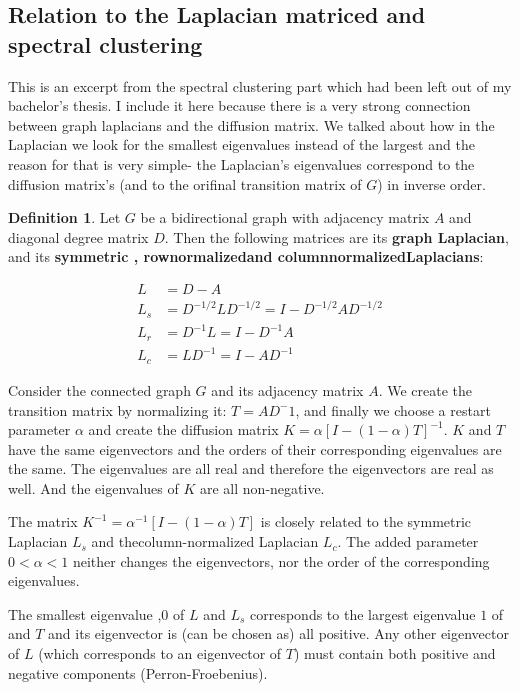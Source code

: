 \documentclass[10pt]{article}
\newcommand{\lt}{<}
\theoremstyle{definition}
\newtheorem{mydef}{Definition}[section]
\theoremstyle{remark}
\theoremstyle{plain}
\begin{document}
\subsection{Relation to the Laplacian matriced and spectral
clustering}

This is an excerpt from the spectral clustering part which had been
left out of my bachelor's thesis. I include it here because
there is a very strong connection between graph laplacians and
the diffusion matrix. We talked about how in the Laplacian
we look for the smallest eigenvalues instead of the largest and the
reason for that is very simple- the Laplacian's eigenvalues
correspond to the diffusion matrix's (and to the orifinal transition
matrix of $G$) in inverse order.

\begin{mydef}
\label{def:Laplacian}
Let $G$ be a bidirectional graph with adjacency matrix $A$ and diagonal degree
matrix $D$.
Then the following matrices are its \textbf{graph Laplacian}, and its
\textbf{symmetric\textemdash
, row\textendash normalized\textemdash and column\textendash normalized\textemdash Laplacians}:  

\begin{equation}
\begin{aligned}
L & = D - A \\
L_s & = D^{-1/2}LD^{-1/2} = I - D^{-1/2}AD^{-1/2} \\
L_r & = D^{-1}L = I - D^{-1}A \\
L_c & = LD^{-1} = I - AD^{-1}
\end{aligned}
\end{equation}
\end{mydef}

Consider the connected graph $G$ and its adjacency matrix $A$. We create the transition
matrix by normalizing it: $T = AD^-1$, and finally we choose a restart parameter
$\alpha$ and create the diffusion matrix $K = \alpha[I - (1 -
\alpha) T]^{-1}$. 
$K$ and $T$ have the same
eigenvectors and the orders of their corresponding eigenvalues are the same. The
eigenvalues are all real and therefore the eigenvectors are real as well. And
the eigenvalues of $K$ are all non-negative.

The matrix $K^{-1} = \alpha^{-1} [I - (1- \alpha) T]$ is closely related to the
symmetric Laplacian $L_s$ and thecolumn-normalized Laplacian $L_c$. The added parameter $0 \lt \alpha \lt 1$
neither changes the eigenvectors, nor the order of the corresponding eigenvalues.

The smallest eigenvalue ,$0$ of $L$ and $L_s$
corresponds to the largest eigenvalue $1$ of and $T$ and its eigenvector is
(can be chosen as) all positive. 
Any other eigenvector of $L$ (which corresponds to an eigenvector of $T$) must
contain both positive and negative components (Perron-Froebenius).
\end{document}
